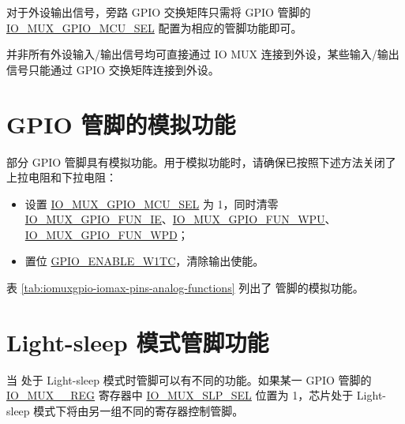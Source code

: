\documentclass[main\_\_CN.tex]{subfiles}
\begin{document}
对于外设输出信号，旁路 GPIO 交换矩阵只需将 GPIO 管脚的 \hyperref[fielddesc:IOMUXGPIONMCUSEL]{IO\_MUX\_GPIO\_MCU\_SEL} 配置为相应的管脚功能即可。

\begin{tiplisting}
并非所有外设输入/输出信号均可直接通过 IO MUX 连接到外设，某些输入/输出信号只能通过 GPIO 交换矩阵连接到外设。
\end{tiplisting}

\section{GPIO 管脚的模拟功能}

\chipname{} 部分 GPIO 管脚具有模拟功能。用于模拟功能时，请确保已按照下述方法关闭了上拉电阻和下拉电阻：

\begin{itemize}
    \item 设置 \hyperref[fielddesc:IOMUXGPIONMCUSEL]{IO\_MUX\_GPIO\_MCU\_SEL} 为 1，同时清零 \hyperref[fielddesc:IOMUXGPIONFUNIE]{IO\_MUX\_GPIO\_FUN\_IE}、\hyperref[fielddesc:IOMUXGPIONFUNIE]{IO\_MUX\_GPIO\_FUN\_WPU}、\hyperref[fielddesc:IOMUXGPIONFUNIE]{IO\_MUX\_GPIO\_FUN\_WPD}；
    \item 置位 \hyperref[fielddesc:GPIOENABLEW1TC]{GPIO\_ENABLE\_W1TC\regindex{[n]}}，清除输出使能。
\end{itemize}
表 \ref{tab:iomuxgpio-iomax-pins-analog-functions} 列出了 \chipname{} 管脚的模拟功能。

\section{Light-sleep 模式管脚功能}

当 \chipname{} 处于 Light-sleep 模式时管脚可以有不同的功能。如果某一 GPIO 管脚的 \hyperref[regdesc:IOMUXGPIONREG]{IO\_MUX\_\_REG} 寄存器中 \hyperref[fielddesc:IOMUXGPIONSLPSEL]{IO\_MUX\_SLP\_SEL} 位置为 1，芯片处于 Light-sleep 模式下将由另一组不同的寄存器控制管脚。
\end{document}
